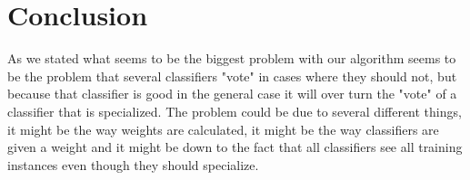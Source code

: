 \section{Conclusion}\label{conclusion}
As we stated what seems to be the biggest problem with our \adaboost{}
algorithm seems to be the problem that several classifiers "vote" in cases where
they should not, but because that classifier is good in the general case it will
over turn the "vote" of a classifier that is specialized. The problem could be
due to several different things, it might be the way weights are calculated, it
might be the way classifiers are given a weight and it might be down to the fact
that all classifiers see all training instances even though they should
specialize.
